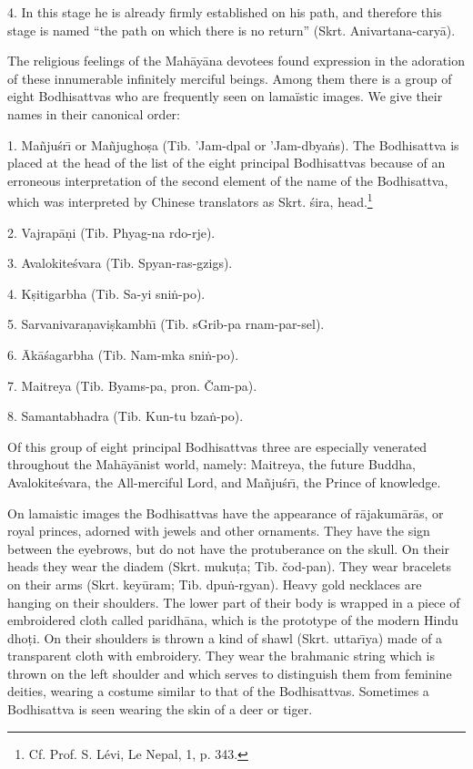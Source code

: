\documentclass[a4paper, 12pt, oneside]{article}
\begin{document}
4. In this stage he is already firmly established on his path, and therefore this stage is named ``the path on which there is no return'' (Skrt. Anivartana-cary\={a}).

The religious feelings of the Mah\={a}y\={a}na devotees found expression in the adoration of these innumerable infinitely merciful beings. Among them there is a group of eight Bodhisattvas who are frequently seen on lamaïstic images. We give their names in their canonical order:

1. Ma\~{n}ju\'{s}r\={\i} or Ma\~{n}jugho\d{s}a (Tib. 'Jam-dpal or 'Jam-dbya\.{n}s). The Bodhisattva is placed at the head of the list of the eight principal Bodhisattvas because of an erroneous interpretation of the second element of the name of the Bodhisattva, which was interpreted by Chinese translators as Skrt. \'{s}ira, head.\footnote{Cf. Prof. S. Lévi, Le Nepal, 1, p. 343.}

2. Vajrap\={a}\d{n}i (Tib. Phyag-na rdo-rje).

3. Avalokite\'{s}vara (Tib. Spyan-ras-gzigs).

4. K\d{s}itigarbha (Tib. Sa-yi sni\.{n}-po).

5. Sarvanivara\d{n}avi\d{s}kambh\={\i} (Tib. sGrib-pa rnam-par-sel).

6. \={A}k\={a}\'{s}agarbha (Tib. Nam-mka sni\.{n}-po).

7. Maitreya (Tib. Byams-pa, pron. Čam-pa).

8. Samantabhadra (Tib. Kun-tu bza\.{n}-po).

Of this group of eight principal Bodhisattvas three are especially venerated throughout the Mah\={a}y\={a}nist world, namely: Maitreya, the future Buddha, Avalokite\'{s}vara, the All-merciful Lord, and Ma\~{n}ju\'{s}r\={\i}, the Prince of knowledge.

On lamaistic images the Bodhisattvas have the appearance of r\={a}jakum\={a}r\={a}s, or royal princes, adorned with jewels and other ornaments. They have the sign between the eyebrows, but do not have the protuberance on the skull. On their heads they wear the diadem (Skrt. muku\d{t}a; Tib. čod-pan). They wear bracelets on their arms (Skrt. key\={u}ram; Tib. dpu\.{n}-rgyan). Heavy gold necklaces are hanging on their shoulders. The lower part of their body is wrapped in a piece of embroidered cloth called paridh\={a}na, which is the prototype of the modern Hindu dho\d{t}i. On their shoulders is thrown a kind of shawl (Skrt. uttar\={\i}ya) made of a transparent cloth with embroidery. They wear the brahmanic string which is thrown on the left shoulder and which serves to distinguish them from feminine deities, wearing a costume similar to that of the Bodhisattvas. Sometimes a Bodhisattva is seen wearing the skin of a deer or tiger.
\end{document}
